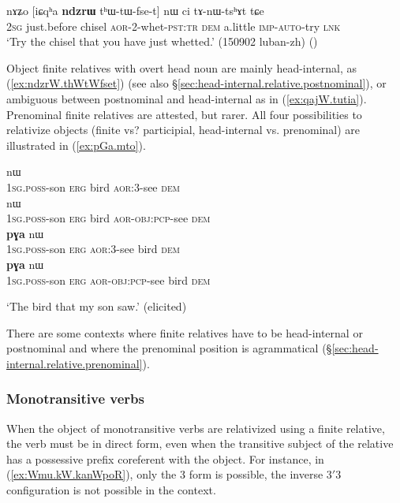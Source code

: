 \begin{exe}
\ex \label{ex:ndzrW.thWtWfset}
\gll nɤʑo [iɕqʰa \textbf{ndzrɯ} tʰɯ-tɯ-fse-t] nɯ ci tɤ-nɯ-tsʰɤt tɕe\\
\textsc{2sg} just.before chisel \textsc{aor}-2-whet-\textsc{pst}:\textsc{tr} \textsc{dem} a.little \textsc{imp}-\textsc{auto}-try \textsc{lnk}\\
\glt `Try the chisel that you have just whetted.' (150902 luban-zh)
()
\end{exe}


Object finite relatives with overt head noun are mainly head-internal, as (\ref{ex:ndzrW.thWtWfset}) (see also §\ref{sec:head-internal.relative.postnominal}), or ambiguous between postnominal and head-internal as in (\ref{ex:qajW.tutia}). Prenominal finite relatives are attested, but rarer. All four possibilities to relativize objects (finite vs? participial, head-internal vs. prenominal) are illustrated in (\ref{ex:pGa.mto}).

\begin{exe}
\ex \label{ex:pGa.mto}
\begin{xlist}
\ex \label{ex:pGa.pamto}
 nɯ \\
\textsc{1sg}.\textsc{poss}-son \textsc{erg} bird \textsc{aor}:3\flobv{}-see \textsc{dem} \\
\ex \label{ex:pGa.pWkAmto}
 nɯ \\
\textsc{1sg}.\textsc{poss}-son \textsc{erg} bird \textsc{aor}-\textsc{obj}:\textsc{pcp}-see \textsc{dem} \\
\ex \label{ex:pamto.pGa}
 \textbf{pɣa} nɯ \\
\textsc{1sg}.\textsc{poss}-son \textsc{erg}  \textsc{aor}:3\flobv{}-see bird \textsc{dem} \\
\ex \label{ex:pWkAmto.pGa}
 \textbf{pɣa} nɯ \\
\textsc{1sg}.\textsc{poss}-son \textsc{erg}  \textsc{aor}-\textsc{obj}:\textsc{pcp}-see bird \textsc{dem} \\
\end{xlist}
\glt `The bird that my son saw.' (elicited)
\end{exe}

There are some contexts where finite relatives have to be head-internal or postnominal and where the prenominal position is agrammatical (§\ref{sec:head-internal.relative.prenominal}). 


\subsubsection{Monotransitive verbs} \label{sec:monotransitive.object.relativization}
When the object of monotransitive verbs are relativized using a finite relative, the verb must be in direct form, even when the transitive subject of the relative has a possessive prefix coreferent with the object. For instance, in (\ref{ex:Wmu.kW.kanWpoR}), only the 3\flobv{} form  is possible, the inverse 3$'$\fl{}3 configuration  is not possible in the context. 


